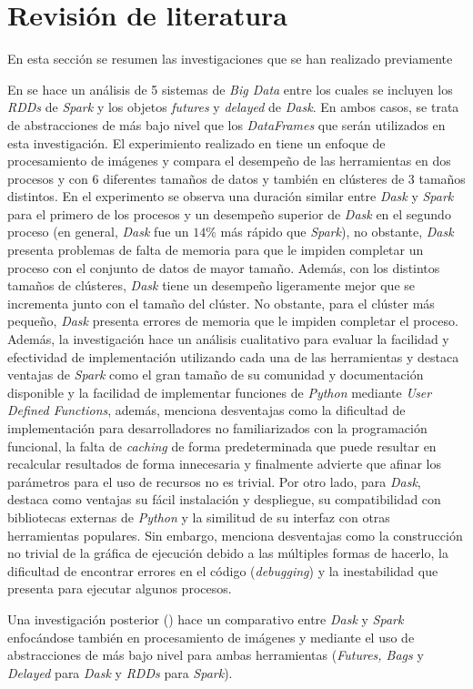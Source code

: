 \chapter{Revisión de literatura}

\noindent En esta sección se resumen las investigaciones que se han realizado previamente  

En \cite{comparative-evolution} se hace un análisis de 5 sistemas de \textit{Big Data} entre los cuales se incluyen los \textit{RDDs} de \textit{Spark} y los objetos \textit{futures} y \textit{delayed} de \textit{Dask}. En ambos casos, se trata de abstracciones de más bajo nivel que los \textit{DataFrames} que serán utilizados en esta investigación. El experimiento realizado en \cite{comparative-evolution} tiene un enfoque de procesamiento de imágenes y compara el desempeño de las herramientas en dos procesos y con 6 diferentes tamaños de datos y también en clústeres de 3 tamaños distintos. En el experimento se observa una duración similar entre \textit{Dask} y \textit{Spark} para el primero de los procesos y un desempeño superior de \textit{Dask} en el segundo proceso (en general, \textit{Dask} fue un $14\%$ más rápido que \textit{Spark}), no obstante, \textit{Dask} presenta problemas de falta de memoria para que le impiden completar un proceso con el conjunto de datos de mayor tamaño. Además, con los distintos tamaños de clústeres, \textit{Dask} tiene un desempeño ligeramente mejor que se incrementa junto con el tamaño del clúster. No obstante, para el clúster más pequeño, \textit{Dask} presenta errores de memoria que le impiden completar el proceso. Además, la investigación hace un análisis cualitativo para evaluar la facilidad y efectividad de implementación utilizando cada una de las herramientas y destaca ventajas de \textit{Spark} como el gran tamaño de su comunidad y documentación disponible y la facilidad de implementar funciones de \textit{Python} mediante \textit{User Defined Functions}, además, menciona desventajas como la dificultad de implementación para desarrolladores no familiarizados con la programación funcional, la falta de \textit{caching} de forma predeterminada que puede resultar en recalcular resultados de forma innecesaria y finalmente advierte que afinar los parámetros para el uso de recursos no es trivial. Por otro lado, para \textit{Dask}, destaca como ventajas su fácil instalación y despliegue, su compatibilidad con bibliotecas externas de \textit{Python} y la similitud de su interfaz con otras herramientas populares. Sin embargo, menciona desventajas como la construcción no trivial de la gráfica de ejecución debido a las múltiples formas de hacerlo, la dificultad de encontrar errores en el código (\textit{debugging}) y la inestabilidad que presenta para ejecutar algunos procesos.

Una investigación posterior (\cite{dask-spark-neuroimaging}) hace un comparativo entre \textit{Dask} y \textit{Spark} enfocándose también en procesamiento de imágenes y mediante el uso de abstracciones de más bajo nivel para ambas herramientas (\textit{Futures, Bags} y \textit{Delayed} para \textit{Dask} y \textit{RDDs} para \textit{Spark}). 

\newpage

